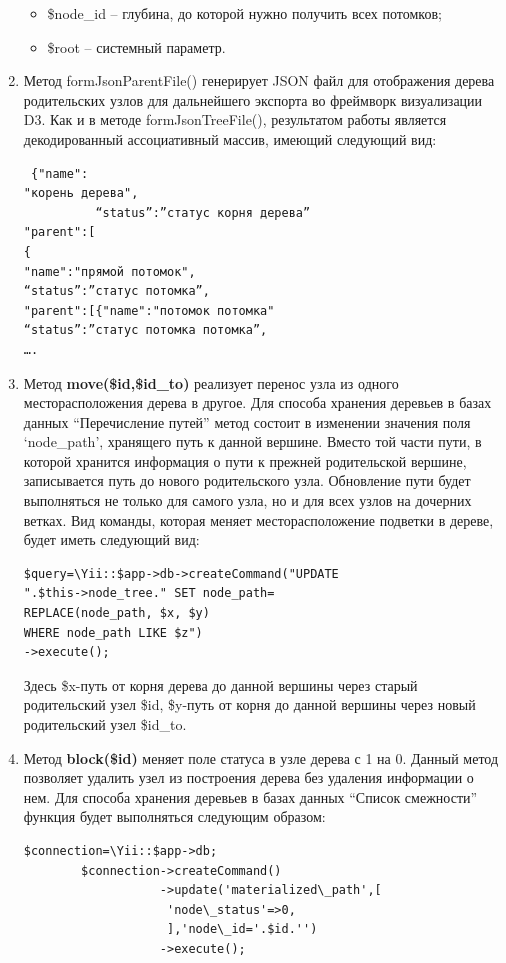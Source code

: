 \documentclass[a4paper,14pt]{extreport}
\theoremstyle{definition}
\begin{document}
\begin{enumerate}
\begin{itemize}
\item \$node\_id – глубина, до которой нужно получить всех потомков;
\item \$root – системный параметр.
\end{itemize}
\item Метод formJsonParentFile() генерирует JSON файл для отображения дерева родительских узлов для дальнейшего экспорта во фреймворк визуализации D3. Как и в методе formJsonTreeFile(), результатом работы является декодированный ассоциативный массив, имеющий следующий вид:
\begin{verbatim} {"name":
"корень дерева",
          “status”:”статус корня дерева”
"parent":[
{
"name":"прямой потомок",
“status”:”статус потомка”,
"parent":[{"name":"потомок потомка"
“status”:”статус потомка потомка”,
….\end{verbatim}
\item Метод \textbf{move(\$id,\$id\_to)} реализует перенос узла из одного месторасположения дерева в другое. Для способа хранения деревьев в базах данных “Перечисление путей” метод состоит в изменении значения поля ‘node\_path’, хранящего путь к данной вершине. Вместо той части пути, в которой хранится информация о пути к прежней родительской вершине, записывается путь до нового родительского узла. Обновление пути будет выполняться не только для самого узла, но и для всех узлов на дочерних ветках. Вид команды, которая меняет месторасположение подветки в дереве, будет иметь следующий вид:\begin{verbatim}
$query=\Yii::$app->db->createCommand("UPDATE
".$this->node_tree." SET node_path=
REPLACE(node_path, $x, $y)
WHERE node_path LIKE $z")
->execute();\end{verbatim}

Здесь \$x-путь от корня дерева до данной вершины через старый родительский узел \$id, \$y-путь от корня до данной вершины через новый родительский узел \$id\_to.
\item  Метод \textbf{block(\$id)} меняет поле статуса в узле дерева с 1 на 0. Данный метод позволяет удалить узел из построения дерева без удаления информации о нем. Для способа хранения деревьев в базах данных “Список смежности” функция будет выполняться следующим образом:\begin{verbatim}
$connection=\Yii::$app->db;
        $connection->createCommand()
                   ->update('materialized\_path',[
                    'node\_status'=>0,
                    ],'node\_id='.$id.'')
                   ->execute();\end{verbatim}


\end{enumerate}
\end{document}
